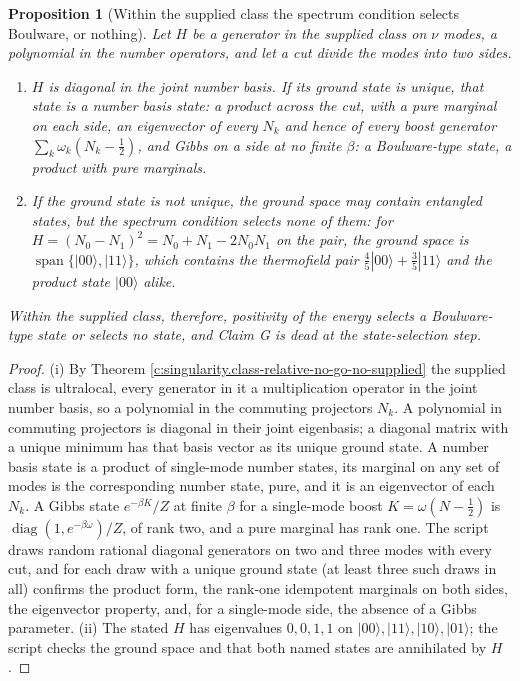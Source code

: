 \documentclass[11pt]{article}
\newtheorem{proposition}[theorem]{Proposition}
\theoremstyle{definition}
\theoremstyle{plain}
\providecommand{\ket}{}\renewcommand{\ket}[1]{|#1\rangle}
\begin{document}
\begin{proposition}[Within the supplied class the spectrum condition selects Boulware, or nothing]\label{c:angle.within-supplied-class-spectrum-condition-selects}
Let $H$ be a generator in the supplied class on $\nu$ modes, a polynomial in the number operators, and let a cut divide the modes into two sides.
\begin{enumerate}
\item[(i)] $H$ is diagonal in the joint number basis. If its ground state is unique, that state is a number basis state: a product across the cut, with a pure marginal on each side, an eigenvector of every $N_{k}$ and hence of every boost generator $\sum_{k}\omega_{k}(N_{k} - \tfrac12)$, and Gibbs on a side at no finite $\beta$: a Boulware-type state, a product with pure marginals.
\item[(ii)] If the ground state is not unique, the ground space may contain entangled states, but the spectrum condition selects none of them: for $H = (N_{0} - N_{1})^{2} = N_{0} + N_{1} - 2N_{0}N_{1}$ on the pair, the ground space is $\operatorname{span}\{\ket{00}, \ket{11}\}$, which contains the thermofield pair $\tfrac45\ket{00} + \tfrac35\ket{11}$ and the product state $\ket{00}$ alike.
\end{enumerate}
Within the supplied class, therefore, positivity of the energy selects a Boulware-type state or selects no state, and Claim G is dead at the state-selection step.
\end{proposition}
\begin{proof}
(i) By Theorem \ref{c:singularity.class-relative-no-go-no-supplied} the supplied class is ultralocal, every generator in it a multiplication operator in the joint number basis, so a polynomial in the commuting projectors $N_{k}$. A polynomial in commuting projectors is diagonal in their joint eigenbasis; a diagonal matrix with a unique minimum has that basis vector as its unique ground state. A number basis state is a product of single-mode number states, its marginal on any set of modes is the corresponding number state, pure, and it is an eigenvector of each $N_{k}$. A Gibbs state $e^{-\beta K}/Z$ at finite $\beta$ for a single-mode boost $K = \omega(N - \tfrac12)$ is $\operatorname{diag}(1, e^{-\beta\omega})/Z$, of rank two, and a pure marginal has rank one. The script draws random rational diagonal generators on two and three modes with every cut, and for each draw with a unique ground state (at least three such draws in all) confirms the product form, the rank-one idempotent marginals on both sides, the eigenvector property, and, for a single-mode side, the absence of a Gibbs parameter. (ii) The stated $H$ has eigenvalues $0, 0, 1, 1$ on $\ket{00}, \ket{11}, \ket{10}, \ket{01}$; the script checks the ground space and that both named states are annihilated by $H$.

\end{proof}
\end{document}

